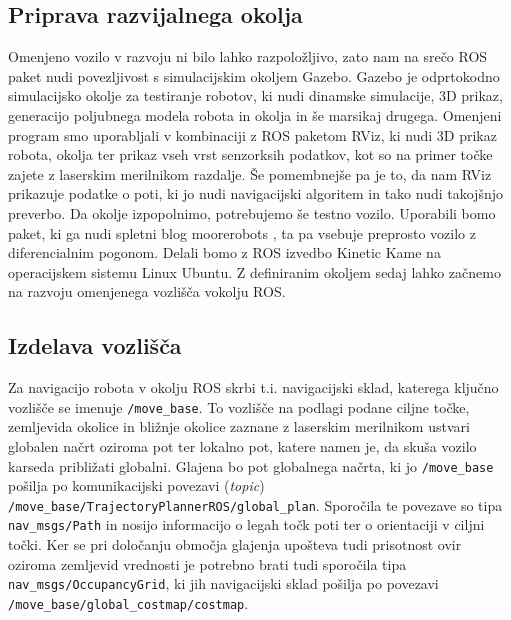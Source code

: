 \documentclass[final,5p,times,twocolumn]{elsarticle}
\begin{document}
\subsection{Priprava razvijalnega okolja}

Omenjeno vozilo v razvoju ni bilo lahko razpoložljivo, zato nam na srečo ROS paket nudi povezljivost s simulacijskim okoljem Gazebo. Gazebo je odprtokodno simulacijsko okolje za testiranje robotov, ki nudi dinamske simulacije, 3D prikaz, generacijo poljubnega modela robota in okolja in še marsikaj drugega. Omenjeni program smo uporabljali v kombinaciji z ROS paketom RViz, ki nudi 3D prikaz robota, okolja ter prikaz vseh vrst senzorksih podatkov, kot so na primer točke zajete z laserskim merilnikom razdalje. Še pomembnejše pa je to, da nam RViz prikazuje podatke o poti, ki jo nudi navigacijski algoritem in tako nudi takojšnjo preverbo. Da okolje izpopolnimo, potrebujemo še testno vozilo. Uporabili bomo paket, ki ga nudi spletni blog moorerobots \cite{moorerobots}, ta pa vsebuje preprosto vozilo z diferencialnim pogonom. Delali bomo z ROS izvedbo Kinetic Kame na operacijskem sistemu Linux Ubuntu. Z definiranim okoljem sedaj lahko začnemo na razvoju omenjenega vozlišča vokolju ROS.

\subsection{Izdelava vozlišča}

Za navigacijo robota v okolju ROS skrbi t.i. navigacijski sklad, katerega ključno vozlišče se imenuje \verb|/move_base|. To vozlišče na podlagi podane ciljne točke, zemljevida okolice in bližnje okolice zaznane z laserskim merilnikom ustvari globalen načrt oziroma pot ter lokalno pot, katere namen je, da skuša vozilo karseda približati globalni. Glajena bo pot globalnega načrta, ki jo \verb|/move_base| pošilja po komunikacijski povezavi (\textit{topic}) \verb|/move_base/TrajectoryPlannerROS/global_plan|. Sporočila te povezave so tipa \verb|nav_msgs/Path| in nosijo informacijo o legah točk poti ter o orientaciji v ciljni točki. Ker se pri določanju območja glajenja upošteva tudi prisotnost ovir oziroma zemljevid vrednosti je potrebno brati tudi sporočila tipa \verb|nav_msgs/OccupancyGrid|, ki jih navigacijski sklad pošilja po povezavi \verb|/move_base/global_costmap/costmap|.
\end{document}
